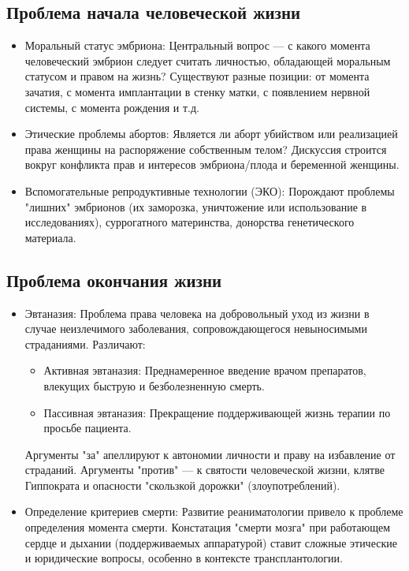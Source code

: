 \documentclass[12pt,a4paper]{article}
\begin{document}
	\subsection{Проблема начала человеческой жизни}
	\begin{itemize}
		\item Моральный статус эмбриона: Центральный вопрос --- с какого момента человеческий эмбрион следует считать личностью, обладающей моральным статусом и правом на жизнь? Существуют разные позиции: от момента зачатия, с момента имплантации в стенку матки, с появлением нервной системы, с момента рождения и т.д.
		\item Этические проблемы абортов: Является ли аборт убийством или реализацией права женщины на распоряжение собственным телом? Дискуссия строится вокруг конфликта прав и интересов эмбриона/плода и беременной женщины.
		\item Вспомогательные репродуктивные технологии (ЭКО): Порождают проблемы "лишних" эмбрионов (их заморозка, уничтожение или использование в исследованиях), суррогатного материнства, донорства генетического материала.
	\end{itemize}
	
	\subsection{Проблема окончания жизни}
	\begin{itemize}
		\item Эвтаназия: Проблема права человека на добровольный уход из жизни в случае неизлечимого заболевания, сопровождающегося невыносимыми страданиями. Различают:
		\begin{itemize}
			\item Активная эвтаназия: Преднамеренное введение врачом препаратов, влекущих быструю и безболезненную смерть.
			\item Пассивная эвтаназия: Прекращение поддерживающей жизнь терапии по просьбе пациента.
		\end{itemize}
		Аргументы "за" апеллируют к автономии личности и праву на избавление от страданий. Аргументы "против" --- к святости человеческой жизни, клятве Гиппократа и опасности "скользкой дорожки" (злоупотреблений).
		\item Определение критериев смерти: Развитие реаниматологии привело к проблеме определения момента смерти. Констатация "смерти мозга" при работающем сердце и дыхании (поддерживаемых аппаратурой) ставит сложные этические и юридические вопросы, особенно в контексте трансплантологии.
	\end{itemize}
	
\end{document}
